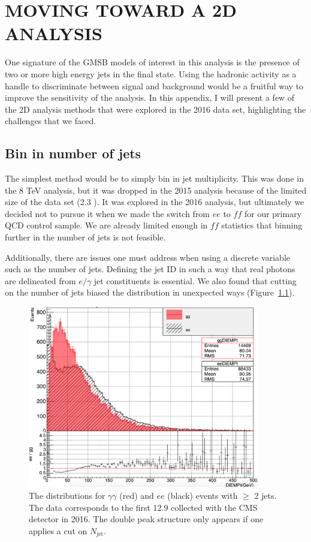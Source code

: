 \chapter{MOVING TOWARD A 2D ANALYSIS}
\label{app:2D}

One signature of the GMSB models of interest in this analysis
is the presence of two or more high energy jets in the final state.
Using the hadronic activity as a handle to discriminate between signal and background
would be a fruitful way to improve the sensitivity of the analysis. 
In this appendix, I will present a few of the 2D analysis methods
that were explored in the 2016 data set, highlighting the challenges 
that we faced. 

\section{Bin in number of jets}
The simplest method would be to simply bin in jet multiplicity.
This was done in the 8 TeV analysis, but it was dropped in the 
2015 analysis because of the limited size of the data set (2.3 \fbinv).
It was explored in the 2016 analysis, but ultimately we decided not 
to pursue it when we made the switch from $ee$ to $ff$ for our 
primary QCD control sample. We are 
already limited enough in $ff$ statistics that binning further 
in the number of jets is not feasible. 

Additionally, there are issues one must address when using 
a discrete variable such as the number of jets. Defining the 
jet ID in such a way that real photons are delineated from 
$e/\gamma$ jet constituents is essential. We also found
that cutting on the number of jets biased the \diempt distribution
in unexpected ways (Figure~\ref{fig:weirdDiempt}).

\begin{figure}[h]
\begin{center}
\includegraphics[width=0.9\textwidth]{Figures/Appendix/weirdDiempt.png}
\end{center}
\caption{The \diempt distributions for $\gamma\gamma$ (red) and $ee$ (black)
events with $\geq$ 2 jets. The data corresponds to the first 12.9 \fbinv collected 
with the CMS detector in 2016. The double peak structure only appears if one 
applies a cut on $N_{\mathrm{jet}}$. }
\label{fig:weirdDiempt}
\end{figure}

